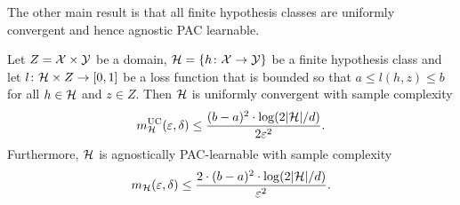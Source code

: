 The other main result is that all finite hypothesis classes are uniformly convergent
and hence agnostic PAC learnable.
\begin{theorem}
Let  $Z = \mathcal{X} \times \mathcal{Y}$ be a domain,
$\mathcal{H} = \{h \colon \mathcal{X} \rightarrow \mathcal{Y} \}$ be a finite hypothesis class and
let $l \colon \mathcal{H} \times Z \rightarrow [0, 1]$ be a loss function that is
bounded so that $a \leq l(h, z) \leq b$ for all $h \in \mathcal{H}$ and $z \in Z$.
Then $\mathcal{H}$ is uniformly convergent with sample complexity
\[
	m_{\mathcal{H}}^{\text{UC}}(\varepsilon, \delta) \leq
        \frac{(b - a)^2 \cdot \log (2 |\mathcal{H}| / d)}{2 \varepsilon^2}.
\]
Furthermore, $\mathcal{H}$ is agnostically PAC-learnable with sample complexity
\[
	m_{\mathcal{H}}(\varepsilon, \delta) \leq
        \frac{2 \cdot (b - a)^2 \cdot \log (2 |\mathcal{H}| / d)}{\varepsilon^2}.
\]
\end{theorem}
